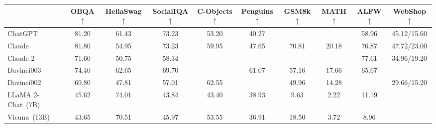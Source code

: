 \begin{table*}[htb]
{\begin{tabular}{lccccccccc}
\cmidrule(r){2-4}\cmidrule(r){5-6}\cmidrule(r){7-8}\cmidrule(r){9-10}
& OBQA$\uparrow$ & HellaSwag$\uparrow$ & SocialIQA$\uparrow$ & C-Objects$\uparrow$ & Penguins$\uparrow$ & GSM8k$\uparrow$ & MATH$\uparrow$ & ALFW$\uparrow$ & WebShop$\uparrow$ \\
\midrule
ChatGPT & \cellcolor[HTML]{FCA77F}81.20 & \cellcolor[HTML]{FCA77F}61.43 & \cellcolor[HTML]{FC8D59}73.23 & \cellcolor[HTML]{FEF7F3}53.20 & \cellcolor[HTML]{FEF7F3}40.27 & \cellcolor[HTML]{FCA77F}{78.47} & \cellcolor[HTML]{FC8D59}{33.78} & \cellcolor[HTML]{FEF7F3}58.96 & \cellcolor[HTML]{FEDCCC}45.12/15.60 \\
Claude & \cellcolor[HTML]{FC8D59}81.80 & \cellcolor[HTML]{FEDCCC}54.95 & \cellcolor[HTML]{FC8D59}73.23 & \cellcolor[HTML]{FEE8DD}59.95 & \cellcolor[HTML]{FEE8DD}47.65 & \cellcolor[HTML]{FEDCCC}70.81 & \cellcolor[HTML]{FEDCCC}20.18 & \cellcolor[HTML]{FCA77F}76.87 & \cellcolor[HTML]{FCA77F}47.72/23.00 \\
Claude 2 & \cellcolor[HTML]{FEE8DD}71.60 & \cellcolor[HTML]{FEE8DD}50.75 & \cellcolor[HTML]{FEE8DD}58.34 & \cellcolor[HTML]{FC8D59}{66.76} & \cellcolor[HTML]{FC8D59}{74.50} & \cellcolor[HTML]{FC8D59}{82.87} & \cellcolor[HTML]{FCA77F}{32.24} & \cellcolor[HTML]{FC8D59}77.61 & \cellcolor[HTML]{FEE8DD}34.96/19.20 \\
Davinci003 & \cellcolor[HTML]{FEDCCC}74.40 & \cellcolor[HTML]{FC8D59}62.65 & \cellcolor[HTML]{FEDCCC}69.70 & \cellcolor[HTML]{FCA77F}{64.60} & \cellcolor[HTML]{FEDCCC}61.07 & \cellcolor[HTML]{FEE8DD}57.16 & \cellcolor[HTML]{FEE8DD}17.66 & \cellcolor[HTML]{FEDCCC}65.67 & \cellcolor[HTML]{FC8D59}{64.08/32.40} \\
Davinci002 & \cellcolor[HTML]{FEF7F3}69.80 & \cellcolor[HTML]{FEF7F3}47.81 & \cellcolor[HTML]{FEF7F3}57.01 & \cellcolor[HTML]{FEDCCC}62.55 & \cellcolor[HTML]{FCA77F}{67.11} & \cellcolor[HTML]{FEF7F3}49.96 & \cellcolor[HTML]{FEF7F3}14.28 & \cellcolor[HTML]{FCA77F}{76.87} & \cellcolor[HTML]{FEF7F3}29.66/15.20 \\
\midrule
LLaMA 2-Chat~(7B) & \cellcolor[HTML]{A7CBE2}45.62 & \cellcolor[HTML]{C6DEED}
74.01 & \cellcolor[HTML]{C4DDEC}43.84 & \cellcolor[HTML]{C4DDEC}43.40 & \cellcolor[HTML]{A7CBE2}38.93 & 9.63 & 2.22 & \cellcolor[HTML]{92BFDB}11.19 & \cellcolor[HTML]{92BFDB}{24.51/5.60} \\
Vicuna~(13B) & \cellcolor[HTML]{E5F0F7}43.65 & \cellcolor[HTML]{E5F0F7}70.51 & \cellcolor[HTML]{C6DEED}45.97 & \cellcolor[HTML]{92BFDB}53.55 & \cellcolor[HTML]{C6DEED}36.91 & \cellcolor[HTML]{92BFDB}18.50 & \cellcolor[HTML]{A7CBE2}3.72 & \cellcolor[HTML]{A7CBE2}8.96 & \cellcolor[HTML]{A7CBE2}{22.74/5.00} \\

\end{tabular}}
\end{table*}
